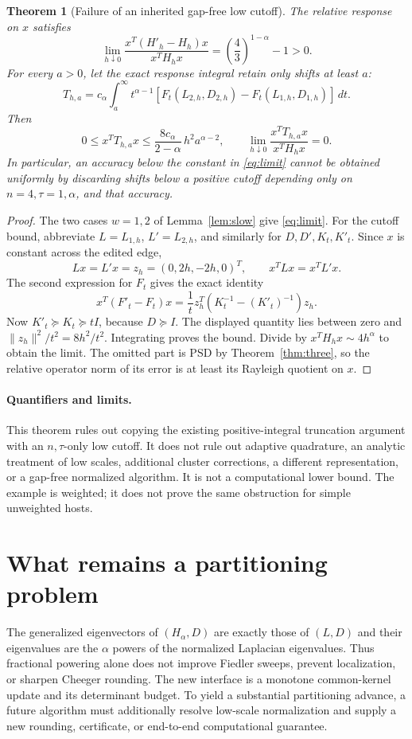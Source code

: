 \documentclass[11pt]{article}
\newtheorem{theorem}{Theorem}
\begin{document}
\begin{theorem}[Failure of an inherited gap-free low cutoff]\label{thm:barrier}
The relative response on $x$ satisfies
\begin{equation}\label{eq:limit}
 \lim_{h\downarrow0}\frac{x^T(H'_h-H_h)x}{x^TH_hx}
   =\left(\frac43\right)^{1-\alpha}-1>0.
\end{equation}
For every $a>0$, let the exact response integral retain only shifts at
least $a$:
\[
 T_{h,a}=c_\alpha\int_a^\infty t^{\alpha-1}
 [F_t(L_{2,h},D_{2,h})-F_t(L_{1,h},D_{1,h})]\,dt.
\]
Then
\[
 0\le x^TT_{h,a}x
 \le\frac{8c_\alpha}{2-\alpha}\,h^2a^{\alpha-2},
 \qquad
 \lim_{h\downarrow0}\frac{x^TT_{h,a}x}{x^TH_hx}=0.
\]
In particular, an accuracy below the constant in \eqref{eq:limit}
cannot be obtained uniformly by discarding shifts below a positive
cutoff depending only on $n=4,\tau=1,\alpha$, and that accuracy.
\end{theorem}
\begin{proof}
The two cases $w=1,2$ of Lemma~\ref{lem:slow} give
\eqref{eq:limit}. For the cutoff bound, abbreviate $L=L_{1,h}$,
$L'=L_{2,h}$, and similarly for $D,D',K_t,K'_t$.
Since $x$ is constant across the edited edge,
\[
 Lx=L'x=z_h=(0,2h,-2h,0)^T,
 \qquad x^TLx=x^TL'x.
\]
The second expression for $F_t$ gives the exact identity
\[
 x^T(F'_t-F_t)x
 =\frac1t z_h^T(K_t^{-1}-(K'_t)^{-1})z_h.
\]
Now $K'_t\succeq K_t\succeq tI$, because $D\succeq I$.
The displayed quantity lies between zero and
$\|z_h\|^2/t^2=8h^2/t^2$. Integrating proves the bound.
Divide by $x^TH_hx\sim4h^\alpha$ to obtain the limit.
The omitted part is PSD by Theorem~\ref{thm:three}, so the relative
operator norm of its error is at least its Rayleigh quotient on $x$.
\end{proof}

\paragraph{Quantifiers and limits.}
This theorem rules out copying the existing positive-integral truncation
argument with an $n,\tau$-only low cutoff. It does not rule out adaptive
quadrature, an analytic treatment of low scales, additional cluster
corrections, a different representation, or a gap-free normalized
algorithm. It is not a computational lower bound. The example is weighted;
it does not prove the same obstruction for simple unweighted hosts.

\section{What remains a partitioning problem}
The generalized eigenvectors of $(H_\alpha,D)$ are exactly those of
$(L,D)$ and their eigenvalues are the $\alpha$ powers of the normalized
Laplacian eigenvalues. Thus fractional powering alone does not improve
Fiedler sweeps, prevent localization, or sharpen Cheeger rounding.
The new interface is a monotone common-kernel update and its determinant
budget. To yield a substantial partitioning advance, a future algorithm
must additionally resolve low-scale normalization and supply a new
rounding, certificate, or end-to-end computational guarantee.
\end{document}
